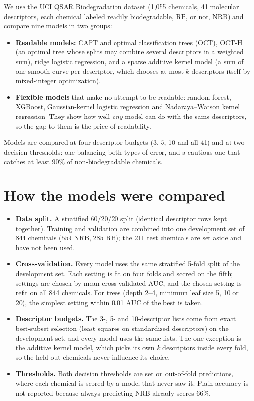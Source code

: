 \documentclass[11pt]{article}
\begin{document}
We use the UCI QSAR Biodegradation dataset (1,055 chemicals, 41 molecular descriptors, each
chemical labeled readily biodegradable, RB, or not, NRB) and compare nine models in two groups:
\begin{itemize}
  \item \textbf{Readable models:} CART and optimal classification trees (OCT), OCT-H (an optimal
        tree whose splits may combine several descriptors in a weighted sum), ridge logistic
        regression, and a sparse additive kernel model (a sum of one smooth curve per descriptor,
        which chooses at most $k$ descriptors itself by mixed-integer optimization).
  \item \textbf{Flexible models} that make no attempt to be readable: random forest, XGBoost,
        Gaussian-kernel logistic regression and Nadaraya--Watson kernel regression. They show how
        well \emph{any} model can do with the same descriptors, so the gap to them is the price of
        readability.
\end{itemize}
Models are compared at four descriptor budgets (3, 5, 10 and all 41) and at two decision
thresholds: one balancing both types of error, and a cautious one that catches at least 90\% of
non-biodegradable chemicals.

\section*{How the models were compared}

\begin{itemize}
  \item \textbf{Data split.} A stratified 60/20/20 split (identical descriptor rows kept together).
        Training and validation are combined into one development set of 844 chemicals (559 NRB,
        285 RB); the 211 test chemicals are set aside and have not been used.
  \item \textbf{Cross-validation.} Every model uses the same stratified 5-fold split of the
        development set. Each setting is fit on four folds and scored on the fifth; settings are
        chosen by mean cross-validated AUC, and the chosen setting is refit on all 844 chemicals.
        For trees (depth 2--4, minimum leaf size 5, 10 or 20), the simplest setting within 0.01 AUC
        of the best is taken.
  \item \textbf{Descriptor budgets.} The 3-, 5- and 10-descriptor lists come from exact best-subset
        selection (least squares on standardized descriptors) on the development set, and every
        model uses the same lists. The one exception is the additive kernel model, which picks its
        own $k$ descriptors inside every fold, so the held-out chemicals never influence its choice.
  \item \textbf{Thresholds.} Both decision thresholds are set on out-of-fold predictions, where
        each chemical is scored by a model that never saw it. Plain accuracy is not reported because
        always predicting NRB already scores 66\%.
\end{itemize}
\end{document}
